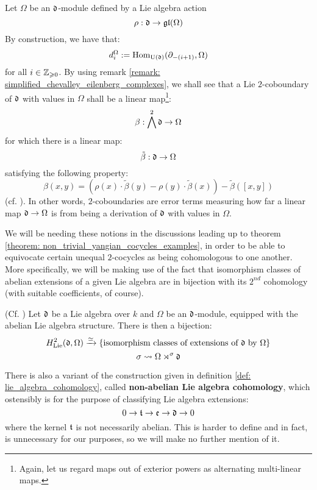         \begin{example} \label{example: low_degree_lie_coboundaries_with_non-trivial_coefficients}
            Let $\Omega$ be an $\mathfrak{d}$-module defined by a Lie algebra action
                $$\rho: \mathfrak{d} \to \mathfrak{gl}(\Omega)$$
            By construction, we have that:
                $$d_i^\Omega := \mathrm{Hom}_{\mathrm{U}(\mathfrak{d})}(\partial_{-(i + 1)}, \Omega)$$
            for all $i \in \mathbb{Z}_{\geqslant 0}$. By using remark \ref{remark: simplified_chevalley_eilenberg_complexes}, we shall see that a Lie $2$-coboundary of $\mathfrak{d}$ with values in $\Omega$ shall be a linear map\footnote{Again, let us regard maps out of exterior powers as alternating multi-linear maps.}:
                $$\beta: \bigwedge^2 \mathfrak{d} \to \Omega$$
            for which there is a linear map:
                $$\tilde{\beta}: \mathfrak{d} \to \Omega$$
            satisfying the following property:
                $$\beta(x, y) = \left( \rho(x) \cdot \tilde{\beta}(y) - \rho(y) \cdot \tilde{\beta}(x) \right) - \tilde{\beta}([x, y])$$
            (cf. \cite[Equation 1.6, p. 421]{kassel_quantum_groups}). In other words, $2$-coboundaries are error terms measuring how far a linear map $\mathfrak{d} \to \Omega$ is from being a derivation of $\mathfrak{d}$ with values in $\Omega$.
        \end{example}

        We will be needing these notions in the discussions leading up to theorem \ref{theorem: non_trivial_yangian_cocycles_examples}, in order to be able to equivocate certain unequal $2$-cocycles as being cohomologous to one another. More specifically, we will be making use of the fact that isomorphism classes of abelian extensions of a given Lie algebra are in bijection with its $2^{nd}$ cohomology (with suitable coefficients, of course).
        \begin{theorem} \label{theorem: H^2_of_lie_algebras_and_abelian_extensions}
            (Cf. \cite[Theorem VII.3.3]{hilton_stammbach_homological_algebra}) Let $\mathfrak{d}$ be a Lie algebra over $k$ and $\Omega$ be an $\mathfrak{d}$-module, equipped with the abelian Lie algebra structure. There is then a bijection:
                $$H^2_{\mathrm{Lie}}(\mathfrak{d}, \Omega) \xrightarrow[]{\simeq} \{ \text{isomorphism classes of extensions of $\mathfrak{d}$ by $\Omega$} \}$$
                $$\sigma \leadsto \Omega \rtimes^{\sigma} \mathfrak{d}$$
        \end{theorem}
        
        \begin{remark}
            There is also a variant of the construction given in definition \ref{def: lie_algebra_cohomology}, called \textbf{non-abelian Lie algebra cohomology}, which ostensibly is for the purpose of classifying Lie algebra extensions:
                $$0 \to \mathfrak{t} \to \mathfrak{e} \to \mathfrak{d} \to 0$$
            where the kernel $\mathfrak{t}$ is not necessarily abelian. This is harder to define and in fact, is unnecessary for our purposes, so we will make no further mention of it.
        \end{remark}
    
